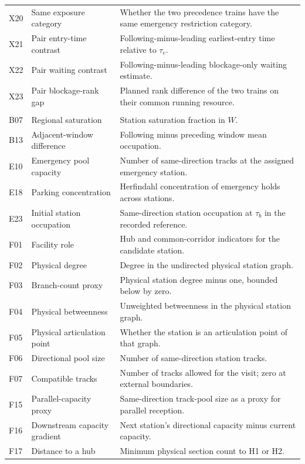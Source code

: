\begin{longtable}{@{}>{\raggedright\arraybackslash}p{0.8cm}>{\raggedright\arraybackslash}p{3.7cm}>{\raggedright\arraybackslash}p{10.0cm}@{}}
X20 & Same exposure category & Whether the two precedence trains have the same emergency restriction category. \\
X21 & Pair entry-time contrast & Following-minus-leading earliest-entry time relative to $\tau_e$. \\
X22 & Pair waiting contrast & Following-minus-leading blockage-only waiting estimate. \\
X23 & Pair blockage-rank gap & Planned rank difference of the two trains on their common running resource. \\
\multicolumn{3}{@{}l}{\textbf{Infrastructure utilization}}\\*[2pt]
B07 & Regional saturation & Station saturation fraction in $W$. \\
B13 & Adjacent-window difference & Following minus preceding window mean occupation. \\
E10 & Emergency pool capacity & Number of same-direction tracks at the assigned emergency station. \\
E18 & Parking concentration & Herfindahl concentration of emergency holds across stations. \\
E23 & Initial station occupation & Same-direction station occupation at $\tau_b$ in the recorded reference. \\
F01 & Facility role & Hub and common-corridor indicators for the candidate station. \\
F02 & Physical degree & Degree in the undirected physical station graph. \\
F03 & Branch-count proxy & Physical station degree minus one, bounded below by zero. \\
F04 & Physical betweenness & Unweighted betweenness in the physical station graph. \\
F05 & Physical articulation point & Whether the station is an articulation point of that graph. \\
F06 & Directional pool size & Number of same-direction station tracks. \\
F07 & Compatible tracks & Number of tracks allowed for the visit; zero at external boundaries. \\
F15 & Parallel-capacity proxy & Same-direction track-pool size as a proxy for parallel reception. \\
F16 & Downstream capacity gradient & Next station's directional capacity minus current capacity. \\
F17 & Distance to a hub & Minimum physical section count to H1 or H2. \\

\end{longtable}
